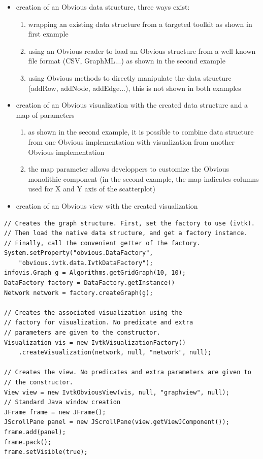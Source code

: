 \begin{itemize}
 \item creation of an Obvious data structure, three ways exist:
 \begin{enumerate}
  \item wrapping an existing data structure from a targeted toolkit as shown in first example
  \item using an Obvious reader to load an Obvious structure from a well known file format (CSV, GraphML...) as shown in the second example
  \item using Obvious methods to directly manipulate the data structure (addRow, addNode, addEdge...), this is not shown in both examples 
 \end{enumerate}
 \item creation of an Obvious visualization with the created data structure and a map of parameters
 \begin{enumerate}
  \item as shown in the second example, it is possible to combine data structure from one Obvious implementation with visualization from another Obvious implementation
  \item the map parameter allows developpers to customize the Obvious monolithic component (in the second example, the map indicates columns used for X and Y axis of the scatterplot)
 \end{enumerate}
 \item creation of an Obvious view with the created visualization
\end{itemize} 

\begin{lstlisting}
// Creates the graph structure. First, set the factory to use (ivtk).
// Then load the native data structure, and get a factory instance.
// Finally, call the convenient getter of the factory.
System.setProperty("obvious.DataFactory",
    "obvious.ivtk.data.IvtkDataFactory");
infovis.Graph g = Algorithms.getGridGraph(10, 10);
DataFactory factory = DataFactory.getInstance()
Network network = factory.createGraph(g);

// Creates the associated visualization using the
// factory for visualization. No predicate and extra
// parameters are given to the constructor.
Visualization vis = new IvtkVisualizationFactory()
    .createVisualization(network, null, "network", null);

// Creates the view. No predicates and extra parameters are given to
// the constructor.
View view = new IvtkObviousView(vis, null, "graphview", null);
// Standard Java window creation
JFrame frame = new JFrame();
JScrollPane panel = new JScrollPane(view.getViewJComponent());
frame.add(panel);
frame.pack();
frame.setVisible(true);
\end{lstlisting}

